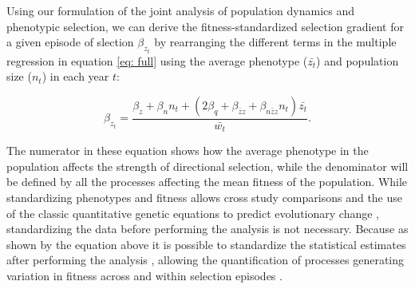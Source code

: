 \documentclass{article}
\begin{document}
Using our formulation of the joint analysis of population dynamics and phenotypic selection, we can derive the fitness-standardized selection gradient for a given episode of slection $\beta_{z_{t}}$ by rearranging the different terms in the multiple regression in equation \ref{eq: full} using the average phenotype ($\bar{z_t}$) and population size ($n_t$) in each year $t$:

\begin{equation}
\beta_{z_{t}}=\frac{\beta_{z} +  \beta_{n}n_t + (2\beta_{q}+ \beta_{\bar{z}z} +  \beta_{n\bar{z}z}n_t)\bar{z_t}}{\bar{w_{t}}} .
\end{equation}

\noindent The numerator in these equation shows how the average phenotype in the population affects the strength of directional selection, while the denominator will be defined by all the processes affecting the mean fitness of the population. While standardizing phenotypes and fitness allows cross study comparisons and the use of the classic quantitative genetic equations to predict evolutionary change \citep{Lande1983}, standardizing the data before performing the analysis is not necessary. Because as shown by the equation above it is possible to standardize the statistical estimates after performing the analysis \citep{Dingemanse2021}, allowing the quantification of processes generating variation in fitness across and within selection episodes .  
\bigskip
\end{document}
